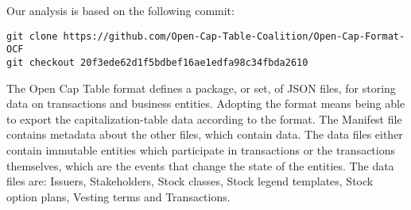 Our analysis is based on the following commit: 

\begin{verbatim}
git clone https://github.com/Open-Cap-Table-Coalition/Open-Cap-Format-OCF
git checkout 20f3ede62d1f5bdbef16ae1edfa98c34fbda2610
\end{verbatim}


The Open Cap Table format defines a package, or set, of JSON files, for storing data on transactions and business entities. Adopting the format means being able to export the \gls{capitalization-table} data according to the format.
%
The Manifest file contains metadata about the other files, which contain data. The data files either contain immutable entities which participate in \glspl{transaction} or the transactions themselves, which are the events that change the state of the entities. The data files are: Issuers, Stakeholders, Stock classes, Stock legend templates, Stock option plans, Vesting terms and Transactions.



